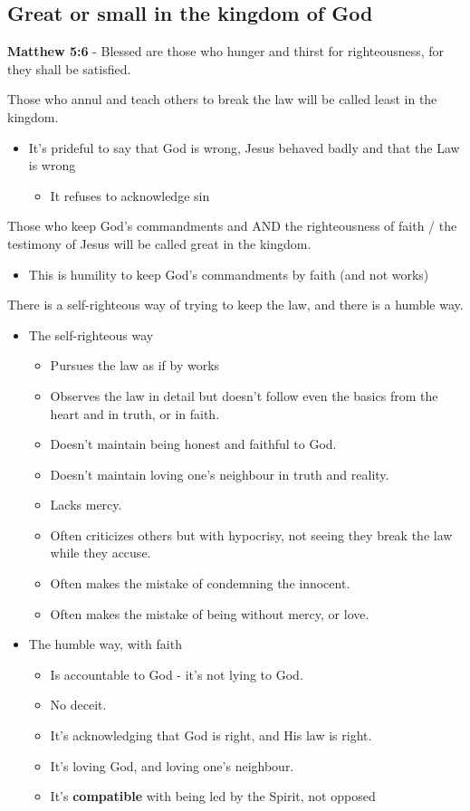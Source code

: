 \documentclass[11pt]{article}
\begin{document}
\subsection{Great or small in the kingdom of God}
\label{sec:org3aaffc4}
\textbf{Matthew 5:6} - Blessed are those who hunger and thirst for righteousness, for they shall be satisfied.

Those who annul and teach others to break the law will be called least in the kingdom.
\begin{itemize}
\item It's prideful to say that God is wrong, Jesus behaved badly and that the Law is wrong
\begin{itemize}
\item It refuses to acknowledge sin
\end{itemize}
\end{itemize}
Those who keep God's commandments and AND the righteousness of faith / the testimony of Jesus will be called great in the kingdom.
\begin{itemize}
\item This is humility to keep God's commandments by faith (and not works)
\end{itemize}

There is a self-righteous way of trying to keep the law, and there is a humble way.
\begin{itemize}
\item The self-righteous way
\begin{itemize}
\item Pursues the law as if by works
\item Observes the law in detail but doesn't follow even the basics from the heart and in truth, or in faith.
\item Doesn't maintain being honest and faithful to God.
\item Doesn't maintain loving one's neighbour in truth and reality.
\item Lacks mercy.
\item Often criticizes others but with hypocrisy, not seeing they break the law while they accuse.
\item Often makes the mistake of condemning the innocent.
\item Often makes the mistake of being without mercy, or love.
\end{itemize}
\item The humble way, with faith
\begin{itemize}
\item Is accountable to God - it's not lying to God.
\item No deceit.
\item It's acknowledging that God is right, and His law is right.
\item It's loving God, and loving one's neighbour.
\item It's \textbf{compatible} with being led by the Spirit, not opposed
\end{itemize}
\end{itemize}
\end{document}
